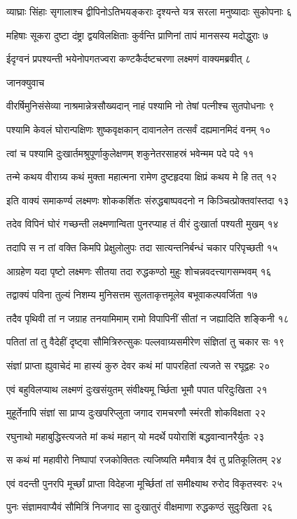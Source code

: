 व्याघ्राः सिंहाः सृगालाश्च द्वीपिनोऽतिभयङ्कराः
दृश्यन्ते यत्र सरला मनुष्यादाः सुकोपनाः ६

महिषाः सूकरा दुष्टा दंष्ट्रा द्वयविलक्षिताः
कुर्वन्ति प्राणिनां तापं मानसस्य मदोद्धुराः ७

ईदृग्वनं प्रपश्यन्ती भयेनोपगतज्वरा
कण्टकैर्दष्टचरणा लक्ष्मणं वाक्यमब्रवीत् ८

जानक्युवाच

वीरर्षिमुनिसंसेव्या नाश्रमान्नेत्रसौख्यदान्
नाहं पश्यामि नो तेषां पत्नीश्च सुतपोधनाः ९

पश्यामि केवलं घोरान्पक्षिणः शुष्कवृक्षकान्
दावानलेन तत्सर्वं दह्यमानमिदं वनम् १०

त्वां च पश्यामि दुःखार्तमश्रुपूर्णाकुलेक्षणम्
शकुनेतरसाहस्रं भवेन्मम पदे पदे ११

तन्मे कथय वीराग्र्य कथं मुक्ता महात्मना
रामेण दुष्टहृदया क्षिप्रं कथय मे हि तत् १२

इति वाक्यं समाकर्ण्य लक्ष्मणः शोककर्शितः
संरुद्धबाष्पवदनो न किञ्चित्प्रोक्तवांस्तदा १३

तदेव विपिनं घोरं गच्छन्ती लक्ष्मणान्विता
पुनरप्याह तं वीरं दुःखार्ता पश्यती मुखम् १४

तदापि स न तां वक्ति किमपि प्रेक्षुलोलुपः
तदा सात्यन्तनिर्बन्धं चकार परिपृच्छती १५

आग्रहेण यदा पृष्टो लक्ष्मणः सीतया तदा
रुद्धकण्ठो मुहुः शोचन्नवदत्त्यागसम्भवम् १६

तद्वाक्यं पविना तुल्यं निशम्य मुनिसत्तम
सुलताकृत्तमूलेव बभूवाकल्पवर्जिता १७

तदैव पृथिवी तां न जग्राह तनयामिमाम्
रामो विपापिनीं सीतां न जह्यादिति शङ्किनी १८

पतितां तां तु वैदेहीं दृष्ट्वा सौमित्रिरुत्सुकः
पल्लवाग्र्यसमीरेण संज्ञितां तु चकार सः १९

संज्ञां प्राप्ता ह्युवाचेदं मा हास्यं कुरु देवर
कथं मां पापरहितां त्यजते स रघूद्वहः २०

एवं बहुविलप्याथ लक्ष्मणं दुःखसंयुतम्
संवीक्ष्यमू र्च्छिता भूमौ पपात परिदुःखिता २१

मुहूर्तेनापि संज्ञां सा प्राप्य दुःखपरिप्लुता
जगाद रामचरणौ स्मंरती शोकविक्षता २२

रघुनाथो महाबुद्धिस्त्यजते मां कथं महान्
यो मदर्थे पयोराशिं बद्धवान्वानरैर्युतः २३

स कथं मां महावीरो निष्पापां रजकोक्तितः
त्यजिष्यति ममैवात्र दैवं तु प्रतिकूलितम् २४

एवं वदन्ती पुनरपि मूर्च्छां प्राप्ता विदेहजा
मूर्च्छितां तां समीक्ष्याथ रुरोद विकृतस्वरः २५

पुनः संज्ञामवाप्यैवं सौमित्रिं निजगाद सा
दुःखातुरं वीक्षमाणा रुद्धकण्ठं सुदुःखिता २६

